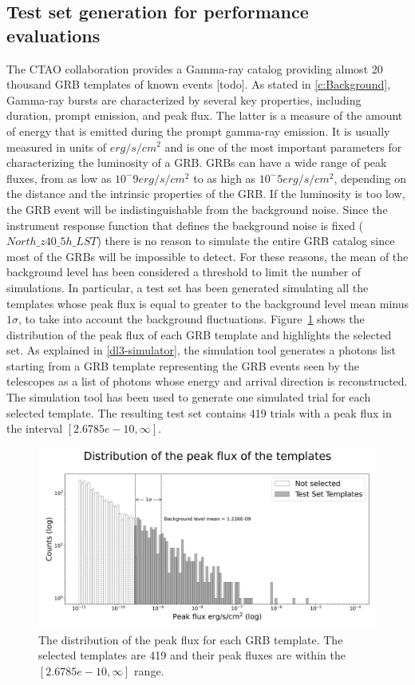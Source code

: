 \subsection{Test set generation for performance evaluations}
\label{s:Experiment-Data}
The CTAO collaboration provides a Gamma-ray catalog providing almost 20 thousand GRB templates of known events [todo]. As stated in \autoref{c:Background}, Gamma-ray bursts are characterized by several key properties, including duration, prompt emission, and peak flux. The latter is a measure of the amount of energy that is emitted during the prompt gamma-ray emission. It is usually measured in units of $erg/s/cm^2$ and is one of the most important parameters for characterizing the luminosity of a GRB. GRBs can have a wide range of peak fluxes, from as low as $10^-9 erg/s/cm^2$ to as high as $10^-5 erg/s/cm^2$, depending on the distance and the intrinsic properties of the GRB. If the luminosity is too low, the GRB event will be indistinguishable from the background noise. Since the instrument response function that defines the background noise is fixed ($North\_z40\_5h\_LST$) there is no reason to simulate the entire GRB catalog since most of the GRBs will be impossible to detect. For these reasons, the mean of the background level has been considered a threshold to limit the number of simulations. In particular, a test set has been generated simulating all the templates whose peak flux is equal to greater to the background level mean minus $1\sigma$, to take into account the background fluctuations. Figure~\ref{f:exp-max-flux-distribution-E} shows the distribution of the peak flux of each GRB template and highlights the selected set. As explained in \autoref{dl3-simulator}, the simulation tool generates a photons list starting from a GRB template representing the GRB events seen by the telescopes as a list of photons whose energy and arrival direction is reconstructed. The simulation tool has been used to generate one simulated trial for each selected template. The resulting test set contains 419 trials with a peak flux in the interval $[2.6785e-10, \infty]$.
\begin{figure}[t]
\centering
\includegraphics[width=1\textwidth]{figures/experiments/templates_max_flux_distributions.png}
\caption{The distribution of the peak flux for each GRB template. The selected templates are 419 and their peak fluxes are within the $[2.6785e-10, \infty]$ range.}
\label{f:exp-max-flux-distribution-E}
\end{figure}

